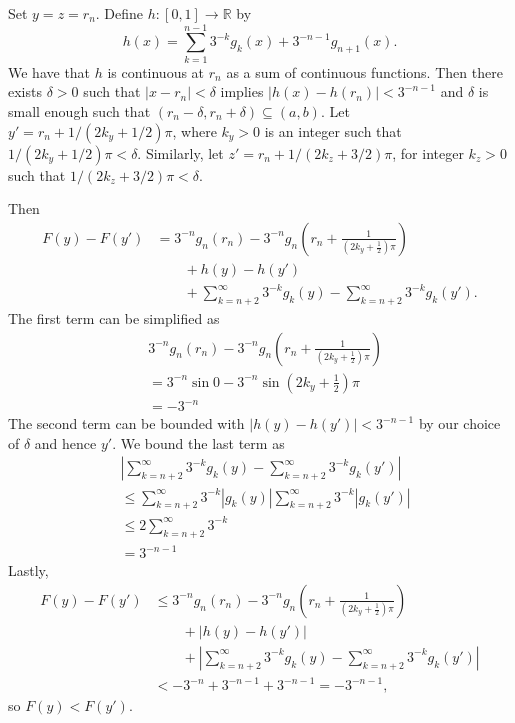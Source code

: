 \documentclass[oneside]{article}
\newcommand\abs[1]{\left|#1\right|}
\newcommand\bbR{\mathbb{R}}
\begin{document}
\begin{enumerate}[label=(\alph*)]
      Set $y = z = r_n$. Define $h : [0, 1] \to \bbR$ by \[
        h(x) = \sum_{k=1}^{n-1} 3^{-k} g_k(x) + 3^{-n-1} g_{n+1}(x) \text{.}
      \] We have that $h$ is continuous at $r_n$ as a sum of continuous functions. Then there exists $\delta > 0$ such that $\abs{x - r_n} < \delta$ implies $\abs{h(x) - h(r_n)} < 3^{-n-1}$ and $\delta$ is small enough such that $(r_n - \delta, r_n + \delta) \subseteq (a, b)$. Let $y' = r_n + 1/(2k_y + 1/2)\pi$, where $k_y > 0$ is an integer such that $1/(2k_y + 1/2)\pi < \delta$. Similarly, let $z' = r_n + 1/(2k_z + 3/2)\pi$, for integer $k_z > 0$ such that $1/(2k_z + 3/2)\pi < \delta$.

      Then \begin{align*}
        F(y) - F(y')
        &= 3^{-n}g_n(r_n) - 3^{-n}g_n\left(r_n + \frac1{\left(2k_y + \frac12\right)\pi}\right) \\
        &\qquad + h(y) - h(y') \\
        &\qquad + \sum_{k=n+2}^\infty 3^{-k} g_k(y) - \sum_{k=n+2}^\infty 3^{-k} g_k(y') \text{.}
      \end{align*} The first term can be simplified as\begin{align*}
        &3^{-n}g_n(r_n) - 3^{-n}g_n\left(r_n + \frac1{\left(2k_y + \frac12\right)\pi}\right) \\
        &= 3^{-n}\sin0 - 3^{-n}\sin\left(2k_y + \frac12\right)\pi \\
        &= -3^{-n}
      \end{align*} The second term can be bounded with $\abs{h(y) - h(y')} < 3^{-n-1}$ by our choice of $\delta$ and hence $y'$. We bound the last term as \begin{align*}
        &\abs{\sum_{k=n+2}^\infty 3^{-k} g_k(y) - \sum_{k=n+2}^\infty 3^{-k} g_k(y')} \\
        &\leq \sum_{k=n+2}^\infty 3^{-k} \abs{g_k(y)}  \sum_{k=n+2}^\infty 3^{-k} \abs{g_k(y')} \\
        &\leq 2\sum_{k=n+2}^\infty 3^{-k} \\
        &= 3^{-n-1}
      \end{align*} Lastly, \begin{align*}
        F(y) - F(y')
        &\leq 3^{-n}g_n(r_n) - 3^{-n}g_n\left(r_n + \frac1{\left(2k_y + \frac12\right)\pi}\right) \\
        &\qquad + \abs{h(y) - h(y')} \\
        &\qquad + \abs{\sum_{k=n+2}^\infty 3^{-k} g_k(y) - \sum_{k=n+2}^\infty 3^{-k} g_k(y')} \\
        &< -3^{-n} + 3^{-n-1} + 3^{-n-1} = -3^{-n-1} \text{,}
      \end{align*} so $F(y) < F(y')$.


\end{enumerate}
\end{document}
